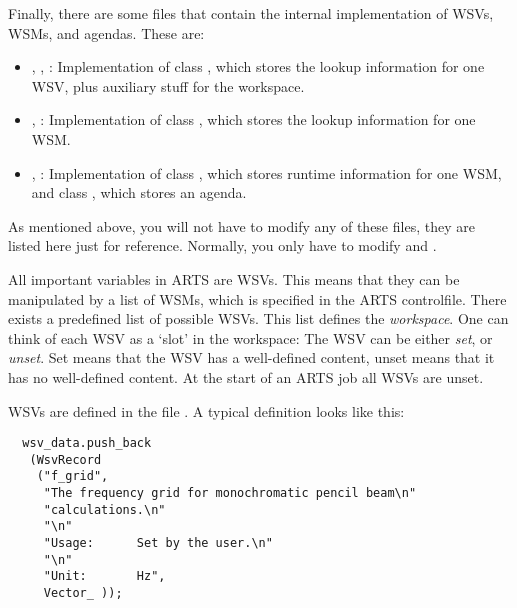 Finally, there are some files that contain the internal implementation
of WSVs, WSMs, and agendas. These are:
\begin{itemize}
\item {}, ,
  : Implementation of class
  , which stores the lookup information for one
  WSV, plus auxiliary stuff for the workspace.
\item {}, :
  Implementation of class , which stores the
  lookup information for one WSM.
\item {}, : Implementation of
  class , which stores runtime information for one WSM,
  and class , which stores an agenda.
\end{itemize}

\vspace{2ex}
As mentioned above, you will not have to modify any of these files,
they are listed here just for reference. Normally, you only have to
modify  and .


\label{sec:agendas:wsvs}

All important variables in ARTS are WSVs. This means that they can be
manipulated by a list of WSMs, which is specified in the ARTS
controlfile. There exists a predefined list of possible WSVs. This
list defines the \emph{workspace}. One can think of each WSV as a
`slot' in the workspace: The WSV can be either \emph{set}, or
\emph{unset}. Set means that the WSV has a well-defined content, unset
means that it has no well-defined content. At the start of an ARTS job
all WSVs are unset.

WSVs are defined in the file . A typical
definition looks like this:

{\small
\begin{verbatim}
  wsv_data.push_back
   (WsvRecord
    ("f_grid",
     "The frequency grid for monochromatic pencil beam\n"
     "calculations.\n"
     "\n"
     "Usage:      Set by the user.\n"
     "\n"
     "Unit:       Hz",
     Vector_ ));
\end{verbatim}}

